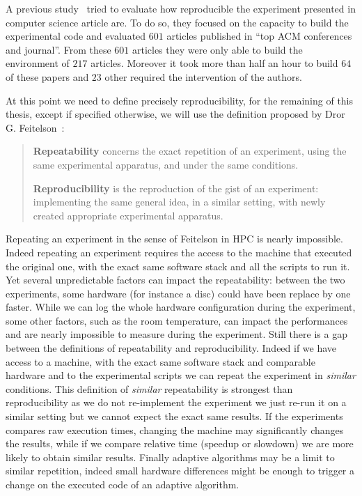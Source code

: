 A previous study~\cite{Collberg15Repeatability} tried to evaluate how reproducible the experiment presented in computer science article are.
To do so, they focused on the capacity to build the experimental code and evaluated $601$ articles published in “top ACM conferences and journal”.
From these $601$ articles they were only able to build the environment of $217$ articles.
Moreover it took more than half an hour to build $64$ of these papers and $23$ other required the intervention of the authors.

At this point we need to define precisely reproducibility, for the remaining
of this thesis, except if specified otherwise, we will use the definition
proposed by Dror G. Feitelson~\cite{Feitelson15From}:

\begin{quote}
    \textbf{Repeatability} concerns the exact repetition of an experiment, using the same experimental apparatus, and under the same conditions.

    \textbf{Reproducibility} is the reproduction of the gist of an experiment: implementing the same general idea, in a similar setting, with newly created appropriate experimental apparatus.
\end{quote}

Repeating an experiment in the sense of Feitelson in \gls{HPC} is nearly impossible.
Indeed repeating an experiment requires the access to the machine that executed the original one, with the exact same software stack and all the scripts to run it.
Yet several unpredictable factors can impact the repeatability: between the two experiments, some hardware (for instance a disc) could have been replace by one faster.
While we can log the whole hardware configuration during the experiment, some other factors, such as the room temperature, can impact the performances and are nearly impossible to measure during the experiment.
Still there is a gap between the definitions of repeatability and reproducibility.
Indeed if we have access to a machine, with the exact same software stack and comparable hardware and to the experimental scripts we can repeat the experiment in \emph{similar} conditions.
This definition of \emph{similar} repeatability is strongest than reproducibility as we do not re-implement the experiment we just re-run it on a similar setting but we cannot expect the exact same results.
If the experiments compares raw execution times, changing the machine may significantly changes the results, while if we compare relative time (speedup or slowdown) we are more likely to obtain similar results.
Finally adaptive algorithms may be a limit to similar repetition, indeed small hardware differences might be enough to trigger a change on the executed code of an adaptive algorithm.

